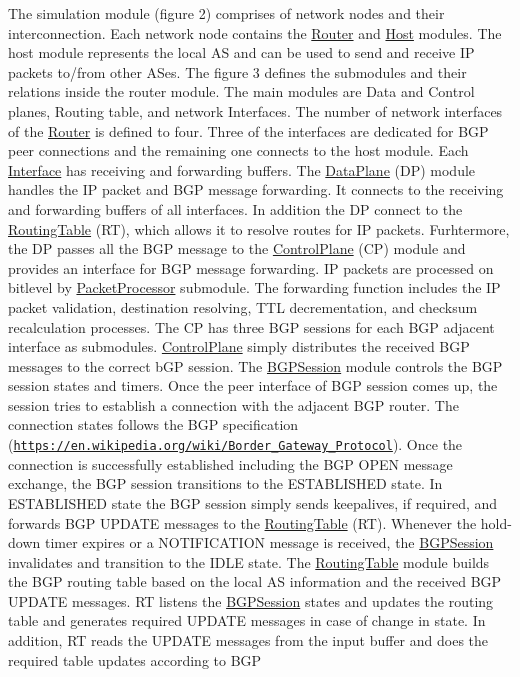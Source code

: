 The simulation module (figure 2) comprises of network nodes and their interconnection. Each network node contains the \hyperlink{classRouter}{Router} and \hyperlink{classHost}{Host} modules. The host module represents the local A\-S and can be used to send and receive I\-P packets to/from other A\-Ses.  The figure 3 defines the submodules and their relations inside the router module. The main modules are Data and Control planes, Routing table, and network Interfaces.  The number of network interfaces of the \hyperlink{classRouter}{Router} is defined to four. Three of the interfaces are dedicated for B\-G\-P peer connections and the remaining one connects to the host module. Each \hyperlink{classInterface}{Interface} has receiving and forwarding buffers. The \hyperlink{classDataPlane}{Data\-Plane} (D\-P) module handles the I\-P packet and B\-G\-P message forwarding. It connects to the receiving and forwarding buffers of all interfaces. In addition the D\-P connect to the \hyperlink{classRoutingTable}{Routing\-Table} (R\-T), which allows it to resolve routes for I\-P packets. Furhtermore, the D\-P passes all the B\-G\-P message to the \hyperlink{classControlPlane}{Control\-Plane} (C\-P) module and provides an interface for B\-G\-P message forwarding. I\-P packets are processed on bitlevel by \hyperlink{classPacketProcessor}{Packet\-Processor} submodule. The forwarding function includes the I\-P packet validation, destination resolving, T\-T\-L decrementation, and checksum recalculation processes. The C\-P has three B\-G\-P sessions for each B\-G\-P adjacent interface as submodules. \hyperlink{classControlPlane}{Control\-Plane} simply distributes the received B\-G\-P messages to the correct b\-G\-P session. The \hyperlink{classBGPSession}{B\-G\-P\-Session} module controls the B\-G\-P session states and timers. Once the peer interface of B\-G\-P session comes up, the session tries to establish a connection with the adjacent B\-G\-P router. The connection states follows the B\-G\-P specification (\href{https://en.wikipedia.org/wiki/Border_Gateway_Protocol}{\tt https\-://en.\-wikipedia.\-org/wiki/\-Border\-\_\-\-Gateway\-\_\-\-Protocol}). Once the connection is successfully established including the B\-G\-P O\-P\-E\-N message exchange, the B\-G\-P session transitions to the E\-S\-T\-A\-B\-L\-I\-S\-H\-E\-D state. In E\-S\-T\-A\-B\-L\-I\-S\-H\-E\-D state the B\-G\-P session simply sends keepalives, if required, and forwards B\-G\-P U\-P\-D\-A\-T\-E messages to the \hyperlink{classRoutingTable}{Routing\-Table} (R\-T). Whenever the hold-\/down timer expires or a N\-O\-T\-I\-F\-I\-C\-A\-T\-I\-O\-N message is received, the \hyperlink{classBGPSession}{B\-G\-P\-Session} invalidates and transition to the I\-D\-L\-E state. The \hyperlink{classRoutingTable}{Routing\-Table} module builds the B\-G\-P routing table based on the local A\-S information and the received B\-G\-P U\-P\-D\-A\-T\-E messages. R\-T listens the \hyperlink{classBGPSession}{B\-G\-P\-Session} states and updates the routing table and generates required U\-P\-D\-A\-T\-E messages in case of change in state. In addition, R\-T reads the U\-P\-D\-A\-T\-E messages from the input buffer and does the required table updates according to B\-G\-P 
